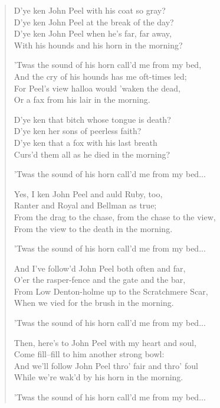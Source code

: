 \begin{verse}
\footnotesize
D'ye ken John Peel with his coat so gray? \\
D'ye ken John Peel at the break of the day? \\
D'ye ken John Peel when he's far, far away, \\
With his hounds and his horn in the morning?

\vin  'Twas the sound of his horn call'd me from my bed, \\
\vin  And the cry of his hounds has me oft-times led; \\
\vin  For Peel's view halloa would 'waken the dead, \\
\vin  Or a fax from his lair in the morning.

D'ye ken that bitch whose tongue is death? \\
D'ye ken her sons of peerless faith? \\
D'ye ken that a fox with his last breath \\
Curs'd them all as he died in the morning?

\vin  'Twas the sound of his horn call'd me from my bed...

Yes, I ken John Peel and auld Ruby, too, \\
Ranter and Royal and Bellman as true; \\
From the drag to the chase, from the chase to the view, \\
From the view to the death in the morning.

\vin  'Twas the sound of his horn call'd me from my bed...

And I've follow'd John Peel both often and far, \\
O'er the rasper-fence and the gate and the bar, \\
From Low Denton-holme up to the Scratchmere Scar, \\
When we vied for the brush in the morning.

\vin  'Twas the sound of his horn call'd me from my bed...

Then, here's to John Peel with my heart and soul, \\
Come fill--fill to him another strong bowl: \\
And we'll follow John Peel thro' fair and thro' foul \\
While we're wak'd by his horn in the morning.

\vin  'Twas the sound of his horn call'd me from my bed...
\end{verse}

\endgroup
